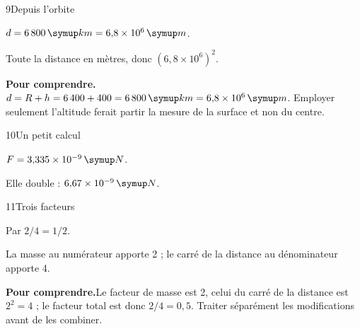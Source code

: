 \par\noindent\begin{minipage}{\linewidth}
\begin{corrige}{9}{Depuis l’orbite}
\begin{questions}
\item $d=6\,800\unite{km}=6{,}8\times10^6\unite m$.
\item Toute la distance en mètres, donc $(6{,}8\times10^6)^2$.
\end{questions}
\par\smallskip\noindent\textbf{Pour comprendre.}\enspace $d=R+h=6\,400+400=6\,800\unite{km}=6{,}8\times10^6\unite m$. Employer seulement l’altitude ferait partir la mesure de la surface et non du centre.\par
{}
\end{corrige}
\end{minipage}
\par\noindent\begin{minipage}{\linewidth}
\begin{corrige}{10}{Un petit calcul}
\begin{questions}
\item $F=3{,}335\times10^{-9}\unite N$.
\item Elle double : $6{,}67\times10^{-9}\unite N$.
\end{questions}
\end{corrige}
\end{minipage}
\par\noindent\begin{minipage}{\linewidth}
\begin{corrige}{11}{Trois facteurs}
\begin{questions}
\item Par $2/4=1/2$.
\item La masse au numérateur apporte 2 ; le carré de la distance au dénominateur apporte 4.
\end{questions}
\par\smallskip\noindent\textbf{Pour comprendre.}\enspace Le facteur de masse est 2, celui du carré de la distance est $2^2=4$ ; le facteur total est donc $2/4=0{,}5$. Traiter séparément les modifications avant de les combiner.\par
\end{corrige}
\end{minipage}
